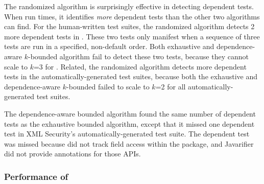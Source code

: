 




The randomized algorithm is surprisingly effective in
detecting dependent tests. When run \trialnum times,
it identifies \textit{more} dependent tests than the other
two algorithms can find. For the human-written
test suites, the randomized algorithm detects 2 more dependent
tests in \jt. These two tests only
manifest when a sequence of three tests are run in a specified,
non-default order. Both exhaustive and dependence-aware $k$-bounded
algorithm fail to detect these two tests, because
they cannot scale to $k$=3 for 
\jt. Related, the randomized algorithm
detects more dependent
tests in the automatically-generated test suites,
because both the exhaustive and dependence-aware $k$-bounded
failed to scale to $k$=2 for all automatically-generated test suites.

The dependence-aware bounded algorithm found the same
number of dependent tests as the exhaustive bounded algorithm, except
that it missed one dependent test in XML Security's
automatically-generated test suite.
The dependent test was missed because \ourtool
did not track field access within the  package,
and Javarifier did not provide annotations for those APIs.


\subsubsection{Performance of \ourtool}
\label{sec:performance}

